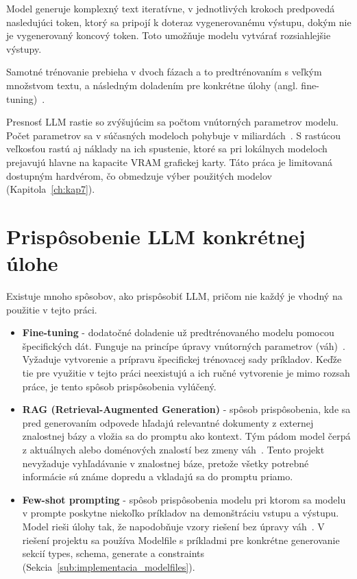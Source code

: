 Model generuje komplexný text iteratívne, v jednotlivých krokoch predpovedá nasledujúci token, ktorý sa pripojí k doteraz vygenerovanému výstupu, dokým nie je vygenerovaný koncový token. Toto umožňuje modelu vytvárať rozsiahlejšie výstupy.


Samotné trénovanie prebieha v dvoch fázach a to predtrénovaním s veľkým množstvom textu, a následným doladením pre konkrétne úlohy (angl. fine-tuning)~\cite{Naveed2024}.


    Presnosť LLM rastie so zvýšujúcim sa počtom vnútorných parametrov modelu. Počet parametrov sa v súčasných modeloch pohybuje v miliardách~\cite{Naveed2024}. S rastúcou veľkosťou rastú aj náklady na ich spustenie, ktoré sa pri lokálnych modeloch prejavujú hlavne na kapacite VRAM grafickej karty. Táto práca je limitovaná dostupným hardvérom, čo obmedzuje výber použitých modelov (Kapitola~\ref{ch:kap7}).

\section{Prispôsobenie LLM konkrétnej úlohe}
\label{sub:prisposobenie_llm}
Existuje mnoho spôsobov, ako prispôsobiť LLM, pričom nie každý je vhodný na použitie v tejto práci.

\begin{itemize}
    \item \textbf{Fine-tuning} - dodatočné doladenie už predtrénovaného modelu pomocou špecifických dát. Funguje na princípe úpravy vnútorných parametrov (váh)~\cite{Naveed2024}. Vyžaduje vytvorenie a prípravu špecifickej trénovacej sady príkladov. Keďže tie pre využitie v tejto práci neexistujú a ich ručné vytvorenie je mimo rozsah práce, je tento spôsob prispôsobenia vylúčený. 
    
    \item \textbf{RAG (Retrieval-Augmented Generation)} - spôsob prispôsobenia, kde sa pred generovaním odpovede hľadajú relevantné dokumenty z externej znalostnej bázy a vložia sa do promptu ako kontext. Tým pádom model čerpá z aktuálnych alebo doménových znalostí bez zmeny váh~\cite{Lewis2020}. Tento projekt nevyžaduje vyhľadávanie v znalostnej báze, pretože všetky potrebné informácie sú známe dopredu a vkladajú sa do promptu priamo.

    \item  \textbf{Few-shot prompting} - spôsob prispôsobenia modelu pri ktorom sa modelu v prompte poskytne niekoľko príkladov na demonštráciu vstupu a výstupu. Model rieši úlohy tak, že napodobňuje vzory riešení bez úpravy váh~\cite{Brown2020}. V riešení projektu sa používa Modelfile s príkladmi pre konkrétne generovanie sekcií types, schema, generate a constraints (Sekcia~\ref{sub:implementacia_modelfiles}).

\end{itemize}

